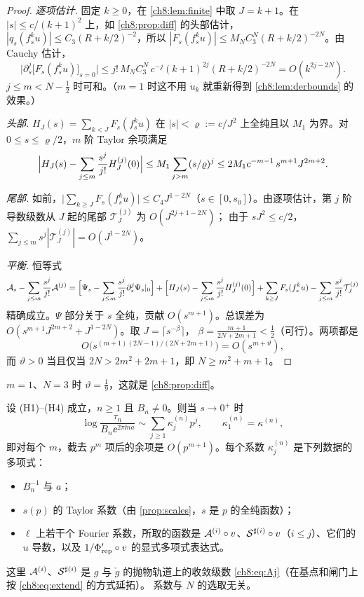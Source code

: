 \begin{proof}
\emph{逐项估计.} 固定 $k\ge0$，在 \cref{ch8:lem:finite} 中取 $J=k+1$。在 $|s|\le c/(k+1)^2$ 上，如 \cref{ch8:prop:diff} 的头部估计，
$|q_s(f_s^ku)|\le C_3(R+k/2)^{-2}$，所以 $|F_s(f_s^ku)|\le M_NC_3^N(R+k/2)^{-2N}$。由 Cauchy 估计，
\[
 \bigl|\partial_s^j\bigl[F_s(f_s^ku)\bigr]_{s=0}\bigr|\le j!\,M_NC_3^N\,c^{-j}(k+1)^{2j}(R+k/2)^{-2N}=O(k^{2j-2N}).
\]
$j\le m<N-\frac12$ 时可和。（$m=1$ 时这不用 $\dot u_k$ 就重新得到 \cref{ch8:lem:derbounds} 的效果。）

\emph{头部.} $H_J(s)=\sum_{k<J}F_s(f_s^ku)$ 在 $|s|<\varrho:=c/J^2$ 上全纯且以 $M_1$ 为界。对 $0\le s\le\varrho/2$，$m$ 阶 Taylor 余项满足
\[
 \Bigl|H_J(s)-\sum_{j\le m}\frac{s^j}{j!}H_J^{(j)}(0)\Bigr|\le M_1\sum_{j>m}(s/\varrho)^j\le2M_1c^{-m-1}\,s^{m+1}J^{2m+2}.
\]

\emph{尾部.} 如前，$\bigl|\sum_{k\ge J}F_s(f_s^ku)\bigr|\le C_4J^{1-2N}$（$s\in[0,s_0]$）。由逐项估计，第 $j$ 阶导数级数从 $J$ 起的尾部 $\mathcal T^{(j)}_J$ 为 $O(J^{2j+1-2N})$；
由于 $sJ^2\le c/2$，$\sum_{j\le m}s^j|\mathcal T^{(j)}_J|=O(J^{1-2N})$。

\emph{平衡.} 恒等式
\[
 \mathcal A_s-\sum_{j\le m}\frac{s^j}{j!}\mathcal A^{(j)}
 =\Bigl[\Psi_s-\sum_{j\le m}\frac{s^j}{j!}\partial_s^j\Psi_s|_0\Bigr]
 +\Bigl[H_J(s)-\sum_{j\le m}\frac{s^j}{j!}H_J^{(j)}(0)\Bigr]
 +\sum_{k\ge J}F_s(f_s^ku)-\sum_{j\le m}\frac{s^j}{j!}\mathcal T_J^{(j)}
\]
精确成立。$\Psi$ 部分关于 $s$ 全纯，贡献 $O(s^{m+1})$。总误差为 $O(s^{m+1}J^{2m+2}+J^{1-2N})$。取 $J=\lceil s^{-\beta}\rceil$，
$\beta=\frac{m+1}{2N+2m+1}<\frac12$（可行）。两项都是
\[
 O\bigl(s^{(m+1)(2N-1)/(2N+2m+1)}\bigr)=O(s^{m+\vartheta}),
\]
而 $\vartheta>0$ 当且仅当 $2N>2m^2+2m+1$，即 $N\ge m^2+m+1$。
\end{proof}

$m=1$、$N=3$ 时 $\vartheta=\frac19$，这就是 \cref{ch8:prop:diff}。

\begin{theorem}[全阶展开]\label{thm:all-orders}
设 (H1)--(H4) 成立，$n\ge1$ 且 $B_n\ne0$。则当 $s\to0^+$ 时
\[
 \log\frac{\tau_n}{B_n\ee^{2\pi\ii na}}\sim\sum_{j\ge1}\kappa^{(n)}_jp^j,\qquad\kappa^{(n)}_1=\kappa^{(n)},
\]
即对每个 $m$，截去 $p^m$ 项后的余项是 $O(p^{m+1})$。每个系数 $\kappa^{(n)}_j$ 是下列数据的多项式：
\begin{itemize}
\item $B_n^{-1}$ 与 $a$；
\item $s(p)$ 的 Taylor 系数（由 \cref{prop:scales}，$s$ 是 $p$ 的全纯函数）；
\item $\ell$ 上若干个 Fourier 系数，所取的函数是 $\mathcal A^{(i)}\circ v$、$\mathcal S^{\sharp(i)}\circ v$（$i\le j$）、它们的 $u$ 导数，以及 $1/\Phi_{\mathrm{rep}}'\circ v$ 的显式多项式表达式。
\end{itemize}
这里 $\mathcal A^{(i)}$、$\mathcal S^{\sharp(i)}$ 是 $g$ 与 $\check g$ 的抛物轨道上的收敛级数 \eqref{ch8:eq:Aj}（在基点和闸门上按 \eqref{ch8:eq:extend} 的方式延拓）。
系数与 $N$ 的选取无关。
\end{theorem}

